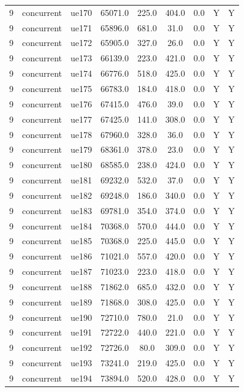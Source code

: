 \begin{table}[ht]
\begin{tabular}{|c|c|c|c|c|c|c|c|c|}
9 & concurrent & ue170 & 65071.0 & 225.0 & 404.0 & 0.0 & Y & Y \\
9 & concurrent & ue171 & 65896.0 & 681.0 & 31.0 & 0.0 & Y & Y \\
9 & concurrent & ue172 & 65905.0 & 327.0 & 26.0 & 0.0 & Y & Y \\
9 & concurrent & ue173 & 66139.0 & 223.0 & 421.0 & 0.0 & Y & Y \\
9 & concurrent & ue174 & 66776.0 & 518.0 & 425.0 & 0.0 & Y & Y \\
9 & concurrent & ue175 & 66783.0 & 184.0 & 418.0 & 0.0 & Y & Y \\
9 & concurrent & ue176 & 67415.0 & 476.0 & 39.0 & 0.0 & Y & Y \\
9 & concurrent & ue177 & 67425.0 & 141.0 & 308.0 & 0.0 & Y & Y \\
9 & concurrent & ue178 & 67960.0 & 328.0 & 36.0 & 0.0 & Y & Y \\
9 & concurrent & ue179 & 68361.0 & 378.0 & 23.0 & 0.0 & Y & Y \\
9 & concurrent & ue180 & 68585.0 & 238.0 & 424.0 & 0.0 & Y & Y \\
9 & concurrent & ue181 & 69232.0 & 532.0 & 37.0 & 0.0 & Y & Y \\
9 & concurrent & ue182 & 69248.0 & 186.0 & 340.0 & 0.0 & Y & Y \\
9 & concurrent & ue183 & 69781.0 & 354.0 & 374.0 & 0.0 & Y & Y \\
9 & concurrent & ue184 & 70368.0 & 570.0 & 444.0 & 0.0 & Y & Y \\
9 & concurrent & ue185 & 70368.0 & 225.0 & 445.0 & 0.0 & Y & Y \\
9 & concurrent & ue186 & 71021.0 & 557.0 & 420.0 & 0.0 & Y & Y \\
9 & concurrent & ue187 & 71023.0 & 223.0 & 418.0 & 0.0 & Y & Y \\
9 & concurrent & ue188 & 71862.0 & 685.0 & 432.0 & 0.0 & Y & Y \\
9 & concurrent & ue189 & 71868.0 & 308.0 & 425.0 & 0.0 & Y & Y \\
9 & concurrent & ue190 & 72710.0 & 780.0 & 21.0 & 0.0 & Y & Y \\
9 & concurrent & ue191 & 72722.0 & 440.0 & 221.0 & 0.0 & Y & Y \\
9 & concurrent & ue192 & 72726.0 & 80.0 & 309.0 & 0.0 & Y & Y \\
9 & concurrent & ue193 & 73241.0 & 219.0 & 425.0 & 0.0 & Y & Y \\
9 & concurrent & ue194 & 73894.0 & 520.0 & 428.0 & 0.0 & Y & Y \\

\end{tabular}
\end{table}
